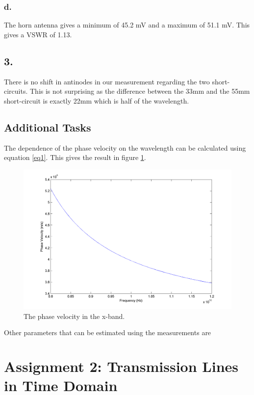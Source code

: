\documentclass{article}
\begin{document}
	\subsubsection*{d.}
	The horn antenna gives a minimum of 45.2 mV and a maximum of 51.1 mV. This gives a VSWR of 1.13.
	
	\subsection*{3.}
	There is no shift in antinodes in our measurement regarding the two short-circuits. This is not surprising as the difference between the 33mm and the 55mm short-circuit is exactly 22mm which is half of the wavelength.
	
	\subsection*{Additional Tasks}
	The dependence of the phase velocity on the wavelength can be calculated using equation \ref{eq1}. This gives the result in figure \ref{fig1}.
	
	\begin{figure}[H]
	\centering
	\includegraphics[width=\textwidth]{plotjes/phasevel.png}
	\caption{The phase velocity in the x-band.}
	\label{fig1}
	\end{figure}
	
	Other parameters that can be estimated using the measurements are
	
	
	
	\section*{Assignment 2: Transmission Lines in Time Domain}
\end{document}
